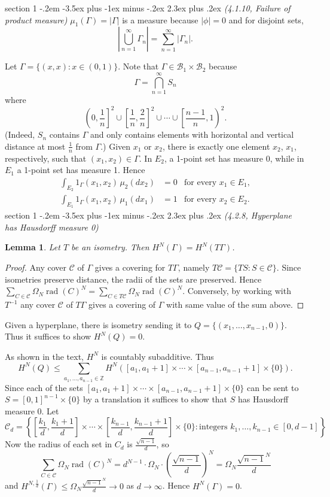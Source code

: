 \documentclass[12pt]{article}
\makeatletter
\theoremstyle{norm}
\newtheorem{lem}[thm]{Lemma}
\newcommand{\Z}[0]{\mathbb{Z}}
\providecommand{\cal}[1]{\mathcal{#1}}
\renewcommand{\cal}[1]{\mathcal{#1}}
\newcommand{\rc}[1]{\frac{1}{#1}}
\newcommand{\Ga}[0]{\Gamma}
\newcommand{\Om}[0]{\Omega}
\newcommand{\ab}[1]{\left| {#1} \right|}
\newcommand{\ba}[1]{\left[ {#1} \right]}
\newcommand{\bc}[1]{\left\{ {#1} \right\}}
\newcommand{\pa}[1]{\left( {#1} \right)}
\newcommand{\rad}{\operatorname{rad}}
\newcommand{\pf}[2]{\pa{\frac{#1}{#2}}}
\newcommand{\iy}[0]{\infty}
\newenvironment{problem}{\@startsection
       {section}
       {1}
       {-.2em}
       {-3.5ex plus -1ex minus -.2ex}
       {2.3ex plus .2ex}
       {\pagebreak[3]%
       \large\bf\noindent{Problem }
       }
       }
       {%
       }
\makeatother
\begin{document}
\begin{problem} {\it (4.1.10, Failure of product measure)}
$\mu_1(\Ga)=|\Ga|$ is a measure because $|\phi|=0$ and for disjoint sets,
\[
\ab{\bigcup_{n=1}^{\iy} \Ga_n}=\sum_{n=1}^{\iy} |\Ga_n|.
\]

Let $\Ga=\{(x,x):x\in (0,1)\}$. Note that $\Ga\in \cal B_1\times \cal B_2$ because 
\[
\Ga=\bigcap_{n=1}^{\iy} S_n
\]
where
\[
\left(0,\rc n\right]^2\cup \ba{\rc n,\frac 2n}^2\cup \cdots \cup \left[\frac{n-1}{n},1\right)^2.
\]
(Indeed, $S_n$ contains $\Ga$ and only contains elements with horizontal and vertical distance at most $\rc n$ from $\Ga$.) Given $x_1$ or $x_2$, there is exactly one element $x_2$, $x_1$, respectively, such that $(x_1,x_2)\in \Ga$. In $E_2$, a 1-point set has measure 0, while in $E_1$ a 1-point set has measure 1. Hence
\begin{align*}
\int_{E_2} 1_{\Ga}(x_1,x_2)\,\mu_2(dx_2)&=0&\text{for every }x_1\in E_1,\\
\int_{E_1} 1_{\Ga}(x_1,x_2)\,\mu_1(dx_1)&=1&\text{for every }x_2\in E_2.
\end{align*}
\end{problem}
\begin{problem}{\it (4.2.8, Hyperplane has Hausdorff measure 0)}
\begin{lem}
Let $T$ be an isometry. Then $H^N(\Ga)=H^N(T\Ga)$.
\end{lem}
\begin{proof}
Any cover $\cal C$ of $\Ga$ gives a covering for $T\Ga$, namely $T\cal C=\{TS:S\in \cal C\}$. Since isometries preserve distance, the radii of the sets are preserved. Hence $\sum_{C\in \cal C}\Om_N \rad(C)^N=\sum_{C\in T\cal C} \Om_N\rad(C)^N$. Conversely, by working with $T^{-1}$ any cover $\cal C$ of $T\Ga$ gives a covering of $\Ga$ with same value of the sum above.
\end{proof}
Given a hyperplane, there is isometry sending it to $Q=\{(x_1,\ldots, x_{n-1},0)\}$. Thus it suffices to show $H^N(Q)=0$.

As shown in the text, $H^N$ is countably subadditive. Thus
\[
H^N(Q)\leq \sum_{a_1,\ldots, a_{n-1}\in \Z} H^N([a_1,a_1+1]\times \cdots \times [a_{n-1},a_{n-1}+1]\times \{0\}).
\]
Since each of the sets $[a_1,a_1+1]\times \cdots \times [a_{n-1},a_{n-1}+1]\times \{0\}$ can be sent to $S=[0,1]^{n-1}\times\{0\}$ by a translation it suffices to show that $S$ has Hausdorff measure 0. Let
\[
\cal C_d=\bc{\ba{\frac{k_1}{d},\frac{k_1+1}{d}}\times \cdots \times \ba{\frac{k_{n-1}}{d},\frac{k_{n-1}+1}{d}}\times\{0\}:\text{integers }k_1,\ldots, k_{n-1}\in [0,d-1]}
\]
Now the radius of each set in $C_d$ is $\frac{\sqrt{n-1}}{d}$, so
\[
\sum_{C\in \cal C} \Om_N\rad(C)^N=d^{N-1}\cdot \Om_N\cdot \pf{\sqrt{n-1}}{d}^N=\Om_N\frac{\sqrt{n-1}^N}{d}
\]
and $H^{N,\rc d}(\Ga)\leq \Om_N\frac{\sqrt{n-1}^N}{d}\to 0$ as $d\to \iy$.  Hence $H^N(\Ga)=0$.
\end{problem}
\end{document}
